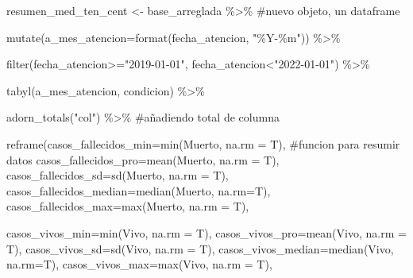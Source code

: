 \documentclass[
  letterpaper,
  DIV=11,
  numbers=noendperiod]{scrreprt}
\newenvironment{Shaded}{\begin{snugshade}}{\end{snugshade}}
\newcommand{\AttributeTok}[1]{\textcolor[rgb]{0.40,0.45,0.13}{#1}}
\newcommand{\CommentTok}[1]{\textcolor[rgb]{0.37,0.37,0.37}{#1}}
\newcommand{\FunctionTok}[1]{\textcolor[rgb]{0.28,0.35,0.67}{#1}}
\newcommand{\NormalTok}[1]{\textcolor[rgb]{0.00,0.23,0.31}{#1}}
\newcommand{\OtherTok}[1]{\textcolor[rgb]{0.00,0.23,0.31}{#1}}
\newcommand{\SpecialCharTok}[1]{\textcolor[rgb]{0.37,0.37,0.37}{#1}}
\newcommand{\StringTok}[1]{\textcolor[rgb]{0.13,0.47,0.30}{#1}}
\begin{document}
\begin{Shaded}
\begin{Highlighting}[]
\NormalTok{resumen\_med\_ten\_cent }\OtherTok{\textless{}{-}}\NormalTok{ base\_arreglada }\SpecialCharTok{\%\textgreater{}\%}  \CommentTok{\#nuevo objeto, un dataframe}
  
  \FunctionTok{mutate}\NormalTok{(}\AttributeTok{a\_mes\_atencion=}\FunctionTok{format}\NormalTok{(fecha\_atencion, }\StringTok{"\%Y{-}\%m"}\NormalTok{)) }\SpecialCharTok{\%\textgreater{}\%} 
 
   \FunctionTok{filter}\NormalTok{(fecha\_atencion}\SpecialCharTok{\textgreater{}=}\StringTok{"2019{-}01{-}01"}\NormalTok{, fecha\_atencion}\SpecialCharTok{\textless{}}\StringTok{"2022{-}01{-}01"}\NormalTok{) }\SpecialCharTok{\%\textgreater{}\%}
  
  \FunctionTok{tabyl}\NormalTok{(a\_mes\_atencion, condicion) }\SpecialCharTok{\%\textgreater{}\%}  
  
  \FunctionTok{adorn\_totals}\NormalTok{(}\StringTok{"col"}\NormalTok{) }\SpecialCharTok{\%\textgreater{}\%} \CommentTok{\#añadiendo total de columna}
  
  \FunctionTok{reframe}\NormalTok{(}\AttributeTok{casos\_fallecidos\_min=}\FunctionTok{min}\NormalTok{(Muerto, }\AttributeTok{na.rm =}\NormalTok{ T), }\CommentTok{\#funcion para resumir datos}
          \AttributeTok{casos\_fallecidos\_pro=}\FunctionTok{mean}\NormalTok{(Muerto, }\AttributeTok{na.rm =}\NormalTok{ T),}
          \AttributeTok{casos\_fallecidos\_sd=}\FunctionTok{sd}\NormalTok{(Muerto, }\AttributeTok{na.rm =}\NormalTok{ T),}
          \AttributeTok{casos\_fallecidos\_median=}\FunctionTok{median}\NormalTok{(Muerto, }\AttributeTok{na.rm=}\NormalTok{T),}
          \AttributeTok{casos\_fallecidos\_max=}\FunctionTok{max}\NormalTok{(Muerto, }\AttributeTok{na.rm =}\NormalTok{ T),}
          
          \AttributeTok{casos\_vivos\_min=}\FunctionTok{min}\NormalTok{(Vivo, }\AttributeTok{na.rm =}\NormalTok{ T),}
          \AttributeTok{casos\_vivos\_pro=}\FunctionTok{mean}\NormalTok{(Vivo, }\AttributeTok{na.rm =}\NormalTok{ T),}
          \AttributeTok{casos\_vivos\_sd=}\FunctionTok{sd}\NormalTok{(Vivo, }\AttributeTok{na.rm =}\NormalTok{ T),}
          \AttributeTok{casos\_vivos\_median=}\FunctionTok{median}\NormalTok{(Vivo, }\AttributeTok{na.rm=}\NormalTok{T),}
          \AttributeTok{casos\_vivos\_max=}\FunctionTok{max}\NormalTok{(Vivo, }\AttributeTok{na.rm =}\NormalTok{ T),}


\end{Highlighting}
\end{Shaded}
\end{document}
